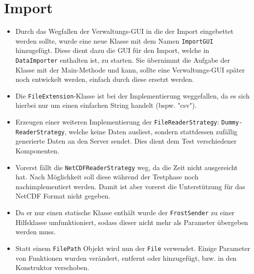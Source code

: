\section{Import}
\begin{itemize}
	\item Durch das Wegfallen der Verwaltungs-GUI in die der Import eingebettet werden sollte, wurde eine neue Klasse mit dem Namen \texttt{ImportGUI} hinzugefügt. Diese dient dazu die GUI für den Import, welche in \texttt{DataImporter} enthalten ist, zu starten. Sie übernimmt die Aufgabe der Klasse mit der Main-Methode und kann, sollte eine Verwaltungs-GUI später noch entwickelt werden, einfach durch diese ersetzt werden.
	\item Die \texttt{FileExtension}-Klasse ist bei der Implementierung weggefallen, da es sich hierbei nur um einen einfachen String handelt (bspw. "csv").
	\item Erzeugen einer weiteren Implementierung der \texttt{FileReaderStrategy}: \texttt{Dummy-\\ReaderStrategy}, welche keine Daten ausliest, sondern stattdessen zufällig generierte Daten an den Server sendet. Dies dient dem Test verschiedener Komponenten.
	\item Vorerst fällt die \texttt{NetCDFReaderStrategy} weg, da die Zeit nicht ausgereicht hat. Nach Möglichkeit soll diese während der Testphase noch nachimplementiert werden. Damit ist aber vorerst die Unterstützung für das NetCDF Format nicht gegeben.
	\item Da er nur einen statische Klasse enthält wurde der \texttt{FrostSender} zu einer Hilfsklasse umfunktioniert, sodass dieser nicht mehr als Parameter übergeben werden muss.
	\item Statt einem \texttt{FilePath} Objekt wird nun der \texttt{File} verwendet. Einige Parameter von Funktionen wurden verändert, entfernt oder hinzugefügt, bzw. in den Konstruktor verschoben.
\end{itemize}


